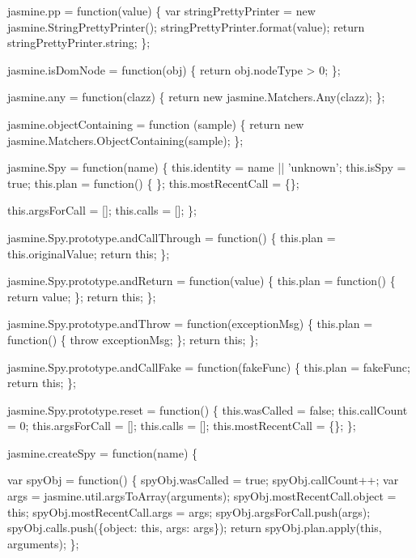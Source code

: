 \begin{DoxyCodeInclude}
jasmine.pp = \textcolor{keyword}{function}(value) \{
  var stringPrettyPrinter = \textcolor{keyword}{new} jasmine.StringPrettyPrinter();
  stringPrettyPrinter.format(value);
  \textcolor{keywordflow}{return} stringPrettyPrinter.string;
\};

jasmine.isDomNode = \textcolor{keyword}{function}(obj) \{
  \textcolor{keywordflow}{return} obj.nodeType > 0;
\};

jasmine.any = \textcolor{keyword}{function}(clazz) \{
  \textcolor{keywordflow}{return} \textcolor{keyword}{new} jasmine.Matchers.Any(clazz);
\};

jasmine.objectContaining = \textcolor{keyword}{function} (sample) \{
    \textcolor{keywordflow}{return} \textcolor{keyword}{new} jasmine.Matchers.ObjectContaining(sample);
\};

jasmine.Spy = \textcolor{keyword}{function}(name) \{
  this.identity = name || \textcolor{stringliteral}{'unknown'};
  this.isSpy = \textcolor{keyword}{true};
  this.plan = \textcolor{keyword}{function}() \{
  \};
  this.mostRecentCall = \{\};

  this.argsForCall = [];
  this.calls = [];
\};

jasmine.Spy.prototype.andCallThrough = \textcolor{keyword}{function}() \{
  this.plan = this.originalValue;
  \textcolor{keywordflow}{return} \textcolor{keyword}{this};
\};

jasmine.Spy.prototype.andReturn = \textcolor{keyword}{function}(value) \{
  this.plan = \textcolor{keyword}{function}() \{
    \textcolor{keywordflow}{return} value;
  \};
  \textcolor{keywordflow}{return} \textcolor{keyword}{this};
\};

jasmine.Spy.prototype.andThrow = \textcolor{keyword}{function}(exceptionMsg) \{
  this.plan = \textcolor{keyword}{function}() \{
    \textcolor{keywordflow}{throw} exceptionMsg;
  \};
  \textcolor{keywordflow}{return} \textcolor{keyword}{this};
\};

jasmine.Spy.prototype.andCallFake = \textcolor{keyword}{function}(fakeFunc) \{
  this.plan = fakeFunc;
  \textcolor{keywordflow}{return} \textcolor{keyword}{this};
\};

jasmine.Spy.prototype.reset = \textcolor{keyword}{function}() \{
  this.wasCalled = \textcolor{keyword}{false};
  this.callCount = 0;
  this.argsForCall = [];
  this.calls = [];
  this.mostRecentCall = \{\};
\};

jasmine.createSpy = \textcolor{keyword}{function}(name) \{

  var spyObj = \textcolor{keyword}{function}() \{
    spyObj.wasCalled = \textcolor{keyword}{true};
    spyObj.callCount++;
    var args = jasmine.util.argsToArray(arguments);
    spyObj.mostRecentCall.object = \textcolor{keyword}{this};
    spyObj.mostRecentCall.args = args;
    spyObj.argsForCall.push(args);
    spyObj.calls.push(\{\textcolor{keywordtype}{object}: \textcolor{keyword}{this}, args: args\});
    \textcolor{keywordflow}{return} spyObj.plan.apply(\textcolor{keyword}{this}, arguments);
  \};


\end{DoxyCodeInclude}
